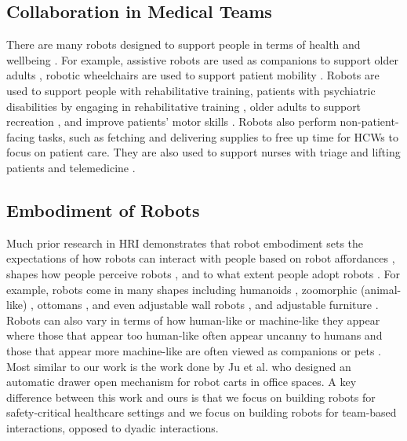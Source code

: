\subsection{Collaboration in Medical Teams}

There are many robots designed to support people in terms of health and wellbeing \cite{kyrarini2021survey,riek2017healthcare}.
For example, assistive robots are used as companions to support older adults \cite{yang2017companion}, robotic wheelchairs are used to support patient mobility \cite{ktistakis2017assistive,jiang2016enhanced}. 
Robots are used to support people with rehabilitative training, patients with psychiatric disabilities by engaging in rehabilitative training \cite{sato2020rehabilitation}, older adults to support recreation  \cite{carros2020exploring}, and improve patients' motor skills \cite{wu2016design}.
Robots also perform non-patient-facing tasks, such as fetching and delivering supplies \cite{ahn2015healthcare,taylor2019coordinating,taylor2021social} to free up time for HCWs to focus on patient care. 
They are also used to support nurses with triage \cite{ahn2015healthcare} and lifting patients \cite{lee2014design} and telemedicine \cite{matsumoto2023robot}.%






\subsection{Embodiment of Robots}

Much prior research in HRI demonstrates that robot embodiment sets the expectations of how robots can interact with people based on robot affordances \cite{norman1999affordance,gibson20133}, shapes how people perceive robots \cite{passman1975mothers,rani2004anxiety, bauer2008human}, and to what extent people adopt robots \cite{riek2017healthcare}.
For example, robots come in many shapes including humanoids \cite{bauer2008human,hayashi2007humanoid,kose2009effects,krogsager2014backchannel}, zoomorphic (animal-like) \cite{short2017understanding,kalegina2018characterizing}, ottomans \cite{sirkin2015mechanical}, and even adjustable wall robots \cite{nguyen2021exploring,wang2019design}, and adjustable furniture \cite{hauser2020roombots,nigolian2017self}.
Robots can also vary in terms of how human-like or machine-like they appear where those that appear too human-like often appear uncanny to humans \cite{strait2015too,koschate2016overcoming} and those that appear more machine-like are often viewed as companions or pets \cite{loffler2020uncanny}. 
Most similar to our work is the work done by Ju et al. \cite{mok2015place} who designed an automatic drawer open mechanism for robot carts in office spaces.
A key difference between this work and ours is that we focus on building robots for safety-critical healthcare settings and we focus on building robots for team-based interactions, opposed to dyadic interactions.


